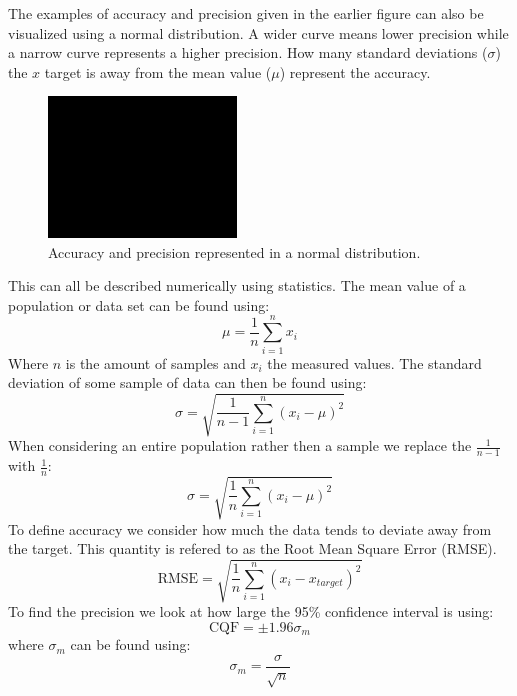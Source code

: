 \documentclass[11pt, a4paper]{article}
\begin{document}
The examples of accuracy and precision given in the earlier figure can also be visualized using a normal distribution. A wider curve means lower precision while a narrow curve represents a higher precision. How many standard deviations ($\sigma$) the $x$ target is away from the mean value ($\mu$) represent the accuracy.
\begin{figure}[h]
  \centerline{\includegraphics[width=50mm]{images/placeholder.png}}
  \caption{Accuracy and precision represented in a normal distribution.}
\end{figure}
This can all be described numerically using statistics. The mean value of a population or data set can be found using:
\begin{equation}
  \mu = \frac{1}{n}\sum_{i=1}^{n}x_i
\end{equation}
Where $n$ is the amount of samples and $x_i$ the measured values. The standard deviation of some sample of data can then be found using:
\begin{equation}
  \sigma = \sqrt{\frac{1}{n-1}\sum_{i=1}^{n}(x_i - \mu)^2}
\end{equation}
When considering an entire population rather then a sample we replace the $\frac{1}{n-1}$ with $\frac{1}{n}$:
\begin{equation}
  \sigma = \sqrt{\frac{1}{n}\sum_{i=1}^{n}(x_i - \mu)^2}
\end{equation}
To define accuracy we consider how much the data tends to deviate away from the target. This quantity is refered to as the Root Mean Square Error (RMSE).
\begin{equation}
  \text{RMSE} = \sqrt{\frac{1}{n}\sum_{i=1}^{n}(x_i - x_{target})^2}
\end{equation}
To find the precision we look at how large the 95\% confidence interval is using:
\begin{equation}
  \text{CQF} = \pm 1.96\sigma_m
\end{equation}
where $\sigma_m$ can be found using:
\begin{equation}
  \sigma_m = \frac{\sigma}{\sqrt{n}}
\end{equation}
\end{document}
